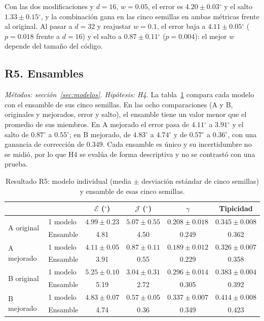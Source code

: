 \documentclass[11pt,a4paper]{article}
\newcommand{\gr}{$^{\circ}$}
\begin{document}
Con las dos modificaciones y $d=16$, $w=0.05$, el error es $4.20\pm0.03$\gr{} y el salto $1.33\pm0.15$\gr{}, y la combinación gana en las cinco semillas en ambas métricas frente al original. Al pasar a $d=32$ y reajustar $w=0.1$, el error baja a $4.11\pm0.05$\gr{} ($p=0.018$ frente a $d=16$) y el salto a $0.87\pm0.11$\gr{} ($p=0.004$): el mejor $w$ depende del tamaño del código.

\subsection{R5. Ensambles}
\label{sec:r5}

\textit{Métodos: sección~\ref{sec:modelos}. Hipótesis: H4.} La tabla~\ref{tab:ens} compara cada modelo con el ensamble de sus cinco semillas. En las ocho comparaciones (A y B, originales y mejorados, error y salto), el ensamble tiene un valor menor que el promedio de sus miembros. En A mejorado el error pasa de $4.11$\gr{} a $3.91$\gr{} y el salto de $0.87$\gr{} a $0.55$\gr{}; en B mejorado, de $4.83$\gr{} a $4.74$\gr{} y de $0.57$\gr{} a $0.36$\gr{}, con una ganancia de corrección de $0.349$. Cada ensamble es único y su incertidumbre no se midió, por lo que H4 se evalúa de forma descriptiva y no se contrastó con una prueba.

\begin{table}[h]
\centering\small
\setlength{\tabcolsep}{3pt}
\begin{tabular}{llcccc}
\toprule
 & & $\mathcal E$ (\gr) & $\mathcal J$ (\gr) & $\gamma$ & Tipicidad \\
\midrule
\multirow{2}{*}{A original} & 1 modelo & $4.99\pm0.23$ & $5.07\pm0.55$ & $0.208\pm0.018$ & $0.345\pm0.008$ \\
 & Ensamble & 4.81 & 4.50 & 0.249 & 0.362 \\
\multirow{2}{*}{A mejorado} & 1 modelo & $4.11\pm0.05$ & $0.87\pm0.11$ & $0.189\pm0.012$ & $0.326\pm0.007$ \\
 & Ensamble & 3.91 & 0.55 & 0.229 & 0.358 \\
\multirow{2}{*}{B original} & 1 modelo & $5.25\pm0.10$ & $3.04\pm0.31$ & $0.296\pm0.014$ & $0.383\pm0.004$ \\
 & Ensamble & 5.19 & 2.72 & 0.305 & 0.392 \\
\multirow{2}{*}{B mejorado} & 1 modelo & $4.83\pm0.07$ & $0.57\pm0.05$ & $0.337\pm0.007$ & $0.414\pm0.008$ \\
 & Ensamble & 4.74 & 0.36 & 0.349 & 0.423 \\
\bottomrule
\end{tabular}
\caption{Resultado R5: modelo individual (media $\pm$ desviación estándar de cinco semillas) y ensamble de esas cinco semillas.}
\label{tab:ens}
\end{table}
\end{document}
